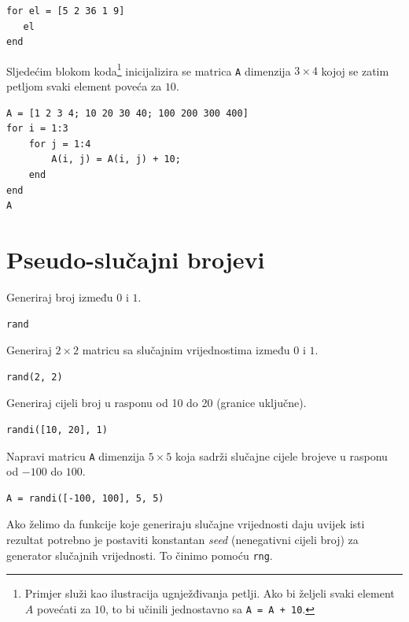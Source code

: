 \documentclass[a4paper, 10pt]{article}
\newcommand{\spec}[1]{\texttt{#1}} %
\newcommand{\eng}[1]{\emph{#1}} %
\begin{document}
\begin{lstlisting}
for el = [5 2 36 1 9]
   el
end
\end{lstlisting}

\pagebreak

Sljedećim blokom koda\footnote{Primjer služi kao ilustracija ugnježđivanja petlji.
Ako bi željeli svaki element $A$ povećati za $10$, to bi učinili jednostavno sa \spec{A = A + 10}.}
inicijalizira se matrica \spec{A} dimenzija $3 \times 4$ kojoj se zatim petljom svaki element poveća za $10$.

\begin{lstlisting}
A = [1 2 3 4; 10 20 30 40; 100 200 300 400]
for i = 1:3
    for j = 1:4
        A(i, j) = A(i, j) + 10;
    end
end
A
\end{lstlisting}


\section{Pseudo-slučajni brojevi}

Generiraj broj između $0$ i $1$.

\begin{lstlisting}
rand
\end{lstlisting}

Generiraj $2 \times 2$ matricu sa slučajnim vrijednostima između $0$ i $1$.

\begin{lstlisting}
rand(2, 2)
\end{lstlisting}

Generiraj cijeli broj u rasponu od 10 do 20 (granice uključne).

\begin{lstlisting}
randi([10, 20], 1)
\end{lstlisting}

Napravi matricu \spec{A} dimenzija $5 \times 5$ koja sadrži slučajne cijele brojeve u rasponu od $-100$ do $100$.

\begin{lstlisting}
A = randi([-100, 100], 5, 5)
\end{lstlisting}

Ako želimo da funkcije koje generiraju slučajne vrijednosti daju uvijek isti rezultat potrebno je postaviti konstantan \eng{seed} (nenegativni cijeli broj) za generator slučajnih vrijednosti.
To činimo pomoću \spec{rng}.
\end{document}

